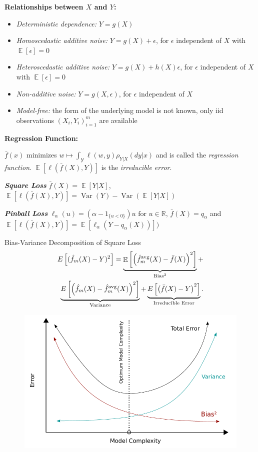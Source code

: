 \documentclass[a4paper,10pt]{article}
\newenvironment{myitemize}
{\vspace{-0.25cm}\begin{itemize}}
{\end{itemize}}
\def\R{\mathbb{R}}
\DeclareMathOperator{\E}{\mathbb{E}}
\DeclareMathOperator{\Var}{Var}
\newcommand{\subtitle}[1]{\begin{normalsize}\vspace{0.25cm}\textbf{#1} \end{normalsize}}
\begin{document}
\begin{small}
\subtitle{Relationships between $X$ and $Y$:}
\vspace{0.2cm}
\begin{myitemize}
    \item \textit{Deterministic dependence:} $Y = g(X)$
    \item \textit{Homoscedastic additive noise:} $Y = g(X) + \epsilon$, for $\epsilon$ independent of $X$ with $\E[\epsilon] = 0$
    \item \textit{Heteroscedastic additive noise:} $Y = g(X) + h(X)\epsilon$, for $\epsilon$ independent of $X$ with $\E[\epsilon] = 0$
    \item \textit{Non-additive noise:} $Y = g(X, \epsilon)$, for $\epsilon$ independent of $X$
    \item \textit{Model-free:} the form of the underlying model is not known, only iid observations $(X_i, Y_i)_{i=1}^m$ are available
\end{myitemize}


\subtitle{Regression Function:}
\(\bar{f}(x)\) minimizes \(w \mapsto \int_{\mathcal{Y}} \ell(w, y) \rho_{Y|X}(dy | x)\) and is called the \textit{regression function}. \(\E[\ell(\bar{f}(X), Y)]\) is the \textit{irreducible error}.

\textbf{\textit{Square Loss}} \(\bar{f}(X) = \E[Y | X]\), \(\E[\ell(\bar{f}(X), Y)] = \Var(Y) - \Var(\E[Y | X])\) 

\textbf{\textit{Pinball Loss}}
\( \ell_{\alpha}(u) = \left( \alpha - 1_{\{u < 0\}} \right) u \text{ for } u \in \R \), \(\bar{f}(X) = q_\alpha\) and \(\E[\ell(\bar{f}(X), Y)] = \E \left[ \ell_\alpha( Y - q_\alpha(X) ) \right ])\) 

\begin{subbox}{Bias-Variance Decomposition of Square Loss}
\begin{align}
E\left[ (\hat{f}_m(X) - Y)^2 \right] = 
\underbrace{ \E \left[ \left( \hat{f}_m^{\text{avg}}(X) - \bar{f}(X) \right)^2 \right]}_{\text{Bias}^2} + \notag  \\
 \underbrace{E\left[ \left( \hat{f}_m(X) - \hat{f}_m^{\text{avg}}(X) \right)^2 \right] }_{\text{Variance}} \notag 
 + \underbrace{E\left[ \left( \bar{f}(X) - Y \right)^2 \right]}_{\text{Irreducible Error}}. \notag
\end{align}
\end{subbox}

\begin{figure}
    \centering
    \vspace{-20pt}
    \includegraphics[width=0.45\columnwidth]{figures/Bias_and_variance_contributing_to_total_error.pdf}
    \vspace{-30pt}
\end{figure}


\end{small}
\end{document}
